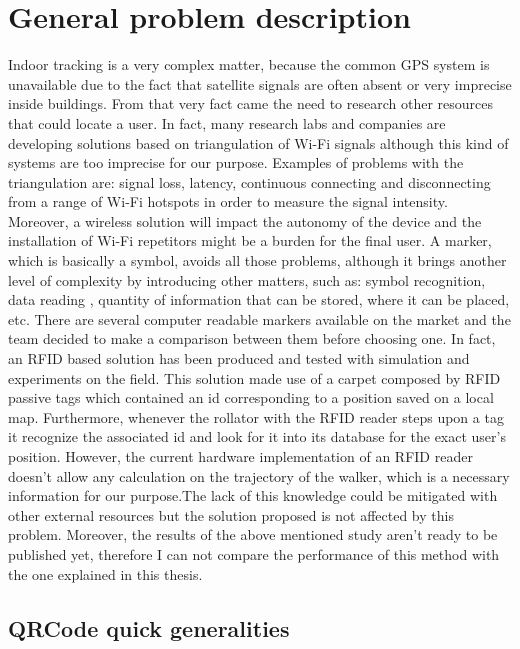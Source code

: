 \chapter{General problem description}

Indoor tracking is a very complex matter, because the common GPS system is unavailable due to the fact that satellite signals are often absent or very imprecise inside buildings. From that very fact came the need to research other resources that could locate a user. In fact, many research labs and companies are developing solutions based on triangulation of Wi-Fi signals although this kind of systems are too imprecise\cite{wifiimprecise} for our purpose. 
Examples of problems with the triangulation are: signal loss, latency, continuous connecting and disconnecting from a range of Wi-Fi hotspots in order to measure the signal intensity. Moreover, a wireless solution will impact the autonomy of the device and the installation of Wi-Fi repetitors might be a burden for the final user. 
A marker, which is basically a symbol, avoids all those problems, although it brings another level of complexity by introducing other matters, such as: symbol recognition, data reading , quantity of information that can be stored, where it can be placed, etc.
There are several computer readable markers available on the market and the team decided to make a comparison between them before choosing one.
In fact, an RFID based solution has been produced and tested with simulation and experiments on the field.
This solution made use of a carpet composed by RFID passive tags which contained an id corresponding to a position saved on a local map. Furthermore, whenever the rollator with the RFID reader steps upon a tag it recognize the associated id and look for it into its database for the exact user's position. However, the current hardware implementation of an RFID reader doesn't allow any calculation on the trajectory of the walker, which is a necessary information for our purpose.The lack of this knowledge could be mitigated with other external resources but the solution proposed is not affected by this problem. Moreover, the results of the above mentioned study aren't ready to be published yet, therefore I can not compare the performance of this method with the one explained in this thesis.
 


\section{QRCode quick generalities}

